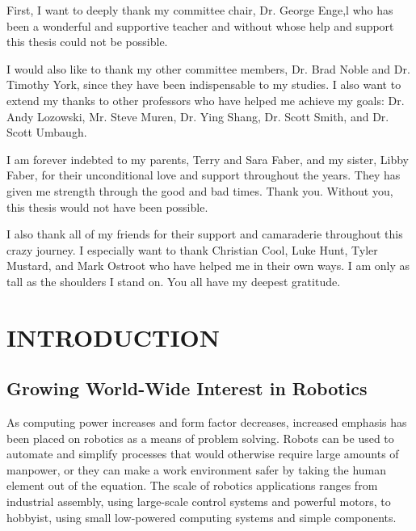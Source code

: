 \documentclass[12pt,oneside,final]{siuethesis}
\theoremstyle{definition}
\begin{document}
\begin{acknowledgements}


First, I want to deeply thank my committee chair, Dr. George Enge,l who has been a wonderful and supportive teacher and without whose help and support this thesis could not be possible. 

I would also like to thank my other committee members, Dr. Brad Noble and Dr. Timothy York, since they have been indispensable to my studies. I also want to extend my thanks to other professors who have helped me achieve my goals:  Dr. Andy Lozowski, Mr. Steve Muren, Dr. Ying Shang, Dr. Scott Smith, and Dr. Scott Umbaugh.

I am forever indebted to my parents, Terry and Sara Faber, and my sister, Libby Faber, for their unconditional love and support throughout the years.  They has given me strength through the good and bad times. Thank you. Without you, this thesis would not have been possible.

I also thank all of my friends for their support and camaraderie throughout this crazy journey. I especially want to thank Christian Cool, Luke Hunt, Tyler Mustard, and Mark Ostroot who have helped me in their own ways. I am only as tall as the shoulders I stand on. You all have my deepest gratitude.

\end{acknowledgements}

\tableofcontents

\cleardoublepage %

\listoffigures %

\cleardoublepage

\listoftables

\mainmatter %


\chapter{INTRODUCTION}  %


\section{Growing World-Wide Interest in Robotics}

As computing power increases and form factor decreases, increased emphasis has been placed on robotics as a means of problem solving.  Robots can be used to automate and simplify processes that would otherwise require large amounts of manpower, or they can make a work environment safer by taking the human element out of the equation. The scale of robotics applications ranges from industrial assembly, using large-scale control systems and powerful motors, to hobbyist, using small low-powered computing systems and simple components.
\end{document}
